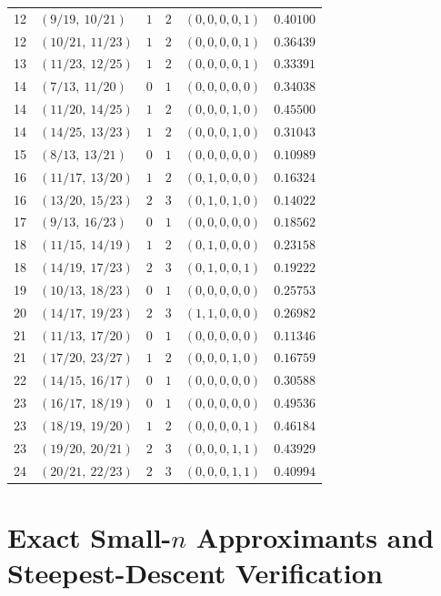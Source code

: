 \documentclass[11pt,reqno]{amsart}
\theoremstyle{definition}
\theoremstyle{remark}
\begin{document}
\begin{table}[ht]
\begin{tabular}{@{}clcccl@{}}
12 & $(9/19,\ 10/21)$ & $1$ & $2$ & $(0,0,0,0,1)$ & $0.40100$ \\
12 & $(10/21,\ 11/23)$ & $1$ & $2$ & $(0,0,0,0,1)$ & $0.36439$ \\
13 & $(11/23,\ 12/25)$ & $1$ & $2$ & $(0,0,0,0,1)$ & $0.33391$ \\
14 & $(7/13,\ 11/20)$ & $0$ & $1$ & $(0,0,0,0,0)$ & $0.34038$ \\
14 & $(11/20,\ 14/25)$ & $1$ & $2$ & $(0,0,0,1,0)$ & $0.45500$ \\
14 & $(14/25,\ 13/23)$ & $1$ & $2$ & $(0,0,0,1,0)$ & $0.31043$ \\
15 & $(8/13,\ 13/21)$ & $0$ & $1$ & $(0,0,0,0,0)$ & $0.10989$ \\
16 & $(11/17,\ 13/20)$ & $1$ & $2$ & $(0,1,0,0,0)$ & $0.16324$ \\
16 & $(13/20,\ 15/23)$ & $2$ & $3$ & $(0,1,0,1,0)$ & $0.14022$ \\
17 & $(9/13,\ 16/23)$ & $0$ & $1$ & $(0,0,0,0,0)$ & $0.18562$ \\
18 & $(11/15,\ 14/19)$ & $1$ & $2$ & $(0,1,0,0,0)$ & $0.23158$ \\
18 & $(14/19,\ 17/23)$ & $2$ & $3$ & $(0,1,0,0,1)$ & $0.19222$ \\
19 & $(10/13,\ 18/23)$ & $0$ & $1$ & $(0,0,0,0,0)$ & $0.25753$ \\
20 & $(14/17,\ 19/23)$ & $2$ & $3$ & $(1,1,0,0,0)$ & $0.26982$ \\
21 & $(11/13,\ 17/20)$ & $0$ & $1$ & $(0,0,0,0,0)$ & $0.11346$ \\
21 & $(17/20,\ 23/27)$ & $1$ & $2$ & $(0,0,0,1,0)$ & $0.16759$ \\
22 & $(14/15,\ 16/17)$ & $0$ & $1$ & $(0,0,0,0,0)$ & $0.30588$ \\
23 & $(16/17,\ 18/19)$ & $0$ & $1$ & $(0,0,0,0,0)$ & $0.49536$ \\
23 & $(18/19,\ 19/20)$ & $1$ & $2$ & $(0,0,0,0,1)$ & $0.46184$ \\
23 & $(19/20,\ 20/21)$ & $2$ & $3$ & $(0,0,0,1,1)$ & $0.43929$ \\
24 & $(20/21,\ 22/23)$ & $2$ & $3$ & $(0,0,0,1,1)$ & $0.40994$ \\
\bottomrule
\end{tabular}
\end{table}

\clearpage
\section{Exact Small-\texorpdfstring{$n$}{n} Approximants and Steepest-Descent Verification}
\label{app:numeric}
\end{document}
